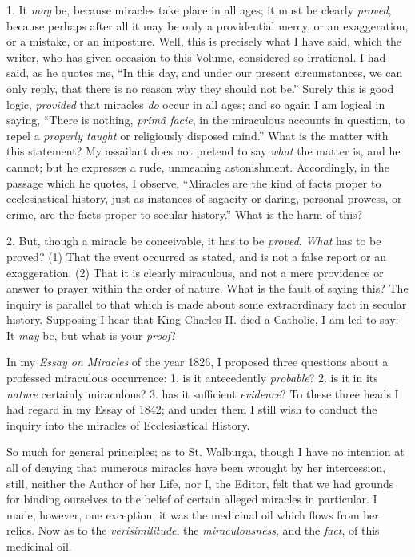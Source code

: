 1. It \emph{may} be, because
miracles take place in all ages; it must be clearly \emph{proved},
because perhaps after all it may be only a providential mercy, or an
exaggeration, or a mistake, or an imposture. Well, this is precisely
what I have said, which the writer, who has
given occasion to this Volume, considered so irrational. I had said, as he quotes me, ``In this day, and
under our present circumstances, we can only reply, that there is no
reason why they should not be.'' Surely this is good logic, \emph{provided}
that miracles \emph{do} occur in all ages; and so again I am logical in saying, ``There is nothing, \emph{primâ facie}, in the
miraculous accounts in question, to repel a \emph{properly taught} or
religiously disposed mind.'' What is the matter with this statement?
My assailant does not pretend to say \emph{what} the matter is, and he
cannot; but he expresses a rude, unmeaning astonishment. Accordingly, in
the passage which he quotes, I observe, ``Miracles are the kind of
facts proper to ecclesiastical history, just as instances of sagacity or
daring, personal prowess, or crime, are the facts proper to secular
history.'' What is the harm of this?

2. But, though a miracle be conceivable, it has to be \emph{proved}.
\emph{What} has to be proved?
(1)
That the event occurred as stated, and is not a false report or an
exaggeration. (2) That it is clearly miraculous, and not a mere
providence or answer to prayer within the order of nature. What is the
fault of saying this? The inquiry is parallel to that which is made
about some extraordinary fact in secular history. Supposing I hear that
King Charles II. died a Catholic, I am led to say: It \emph{may}
be, but what is your \emph{proof}?

In my \emph{Essay on Miracles} of the year 1826, I proposed three questions
about a professed miraculous occurrence: 1. is it antecedently \emph{probable}?
2. is it in its \emph{nature} certainly miraculous? 3. has it sufficient
\emph{evidence}? To these three heads I had regard in my Essay of
1842; and under them I still wish to conduct the inquiry
into the miracles of Ecclesiastical History.

So much for general principles; as to St. Walburga,
though I have no intention at all of denying that numerous miracles have
been wrought by her intercession, still, neither the Author of her Life,
nor I, the Editor, felt that we had grounds for binding ourselves to the
belief of certain alleged miracles in particular. I made, however, one
exception; it was the
medicinal oil which flows from her relics. Now as to the \emph{verisimilitude}, the \emph{miraculousness}, and
the \emph{fact}, of this medicinal oil.

